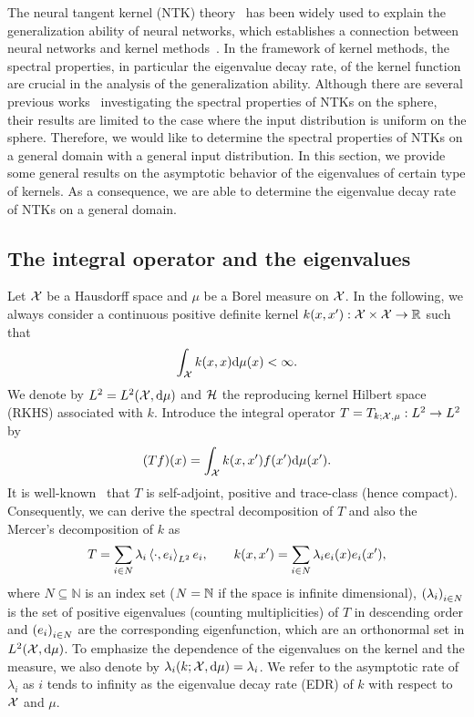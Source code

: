 The neural tangent kernel (NTK) theory~\citep{jacot2018_NeuralTangent} has been widely used to explain the generalization ability of neural networks,
which establishes a connection between neural networks and kernel methods~\citep{caponnetto2007_OptimalRates,bauer2007_RegularizationAlgorithms}.
In the framework of kernel methods, the spectral properties, in particular the eigenvalue decay rate,
of the kernel function are crucial in the analysis of the generalization ability.
Although there are several previous works~\citep{bietti2019_InductiveBias,chen2020_DeepNeural,geifman2020_SimilarityLaplace,bietti2020_DeepEquals}
investigating the spectral properties of NTKs on the sphere,
their results are limited to the case where the input distribution is uniform on the sphere.
Therefore, we would like to determine the spectral properties of NTKs on a general domain with a general input distribution.
In this section, we provide some general results on the asymptotic behavior of the eigenvalues of certain type of kernels.
As a consequence, we are able to determine the eigenvalue decay rate of NTKs on a general domain.

\subsection{The integral operator and the eigenvalues}
Let $\mathcal{X}$ be a Hausdorff space and $\mu$ be a Borel measure on $\mathcal{X}$.
In the following, we always consider a continuous positive definite kernel $k(x,x') : \mathcal{X} \times \mathcal{X} \to \mathbb{R}$ such that
\begin{align}
  \label{eq:IntegrableKernel}
  \int_{\mathcal{X}} k(x,x) \dd \mu(x) < \infty.
\end{align}
We denote by $L^2 = L^2(\mathcal{X},\dd \mu)$ and $\mathcal{H}$ the reproducing kernel Hilbert space (RKHS) associated with $k$.
Introduce the integral operator $T = T_{k;\mathcal{X},\mu}: L^2 \to L^2$ by
\begin{align}
  \label{eq:T_Def}
  (Tf)(x) = \int_{\mathcal{X}} k(x,x') f(x') \dd \mu(x').
\end{align}
It is well-known~\citep{andreaschristmann2008_SupportVector,steinwart2012_MercerTheorem} that $T$ is self-adjoint, positive and trace-class (hence compact).
Consequently, we can derive the spectral decomposition of $T$ and also the Mercer's decomposition of $k$ as
\begin{align}
  \label{eq:MercerDecomp}
  T = \sum_{i\in N} \lambda_i \left\langle{\cdot,e_i}\right\rangle_{L^2} e_i, \quad\quad
  k(x,x') = \sum_{i\in N} \lambda_i e_i(x) e_i(x'),
\end{align}
where $N \subseteq \mathbb{N}$ is an index set ($N = \mathbb{N}$ if the space is infinite dimensional),
$\left(\lambda_i\right)_{i \in N}$ is the set of positive eigenvalues (counting multiplicities) of $T$ in descending order
and $\left(e_i\right)_{i \in N}$ are the corresponding eigenfunction, which are an orthonormal set in $L^2(\mathcal{X},\dd \mu)$.
To emphasize the dependence of the eigenvalues on the kernel and the measure,
we also denote by $\lambda_i(k;\mathcal{X},\dd \mu) = \lambda_i$.
We refer to the asymptotic rate of $\lambda_i$ as $i$ tends to infinity as the eigenvalue decay rate (EDR) of $k$ with respect to $\mathcal{X}$ and $\mu$.

